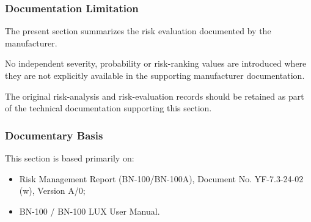 \subsubsection{Documentation Limitation}

The present section summarizes the risk evaluation documented by the
manufacturer.

No independent severity, probability or risk-ranking values are introduced
where they are not explicitly available in the supporting manufacturer
documentation.

The original risk-analysis and risk-evaluation records should be retained
as part of the technical documentation supporting this section.

\subsubsection{Documentary Basis}

This section is based primarily on:

\begin{itemize}

    \item Risk Management Report (BN-100/BN-100A), Document No.
    YF-7.3-24-02 (w), Version A/0;

    \item BN-100 / BN-100 LUX User Manual.

\end{itemize}

